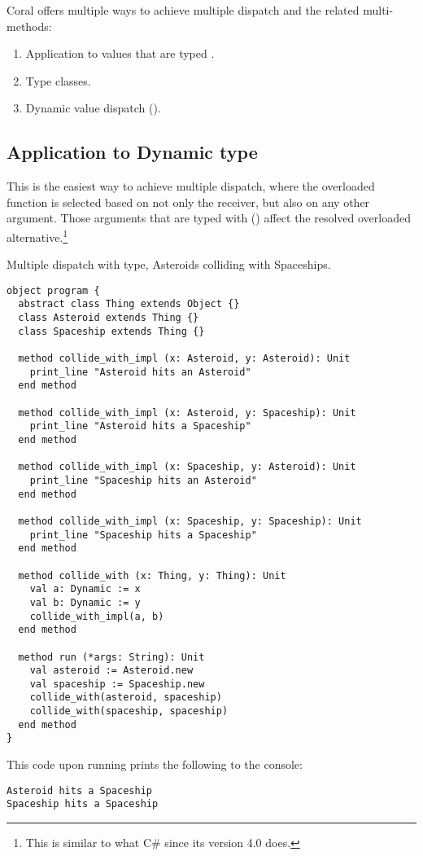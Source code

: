 Coral offers multiple ways to achieve multiple dispatch and the related multi-methods: 

\begin{enumerate}
  \item Application to values that are typed .
  \item Type classes. 
  \item Dynamic value dispatch (). 
\end{enumerate}




\subsection{Application to Dynamic type}

This is the easiest way to achieve multiple dispatch, where the overloaded function is selected based on not only the receiver, but also on any other argument. Those arguments that are typed with  () affect the resolved overloaded alternative.\footnote{This is similar to what C\# since its version 4.0 does.}

\example Multiple dispatch with  type, Asteroids colliding with Spaceships.  
\begin{lstlisting}[morekeywords={Dynamic}]
object program {
  abstract class Thing extends Object {}
  class Asteroid extends Thing {}
  class Spaceship extends Thing {}
  
  method collide_with_impl (x: Asteroid, y: Asteroid): Unit
    print_line "Asteroid hits an Asteroid"
  end method
  
  method collide_with_impl (x: Asteroid, y: Spaceship): Unit
    print_line "Asteroid hits a Spaceship"
  end method
  
  method collide_with_impl (x: Spaceship, y: Asteroid): Unit
    print_line "Spaceship hits an Asteroid"
  end method
  
  method collide_with_impl (x: Spaceship, y: Spaceship): Unit
    print_line "Spaceship hits a Spaceship"
  end method
  
  method collide_with (x: Thing, y: Thing): Unit
    val a: Dynamic := x
    val b: Dynamic := y
    collide_with_impl(a, b)
  end method
  
  method run (*args: String): Unit
    val asteroid := Asteroid.new
    val spaceship := Spaceship.new
    collide_with(asteroid, spaceship)
    collide_with(spaceship, spaceship)
  end method
}
\end{lstlisting}
This code upon running  prints the following to the console:
\begin{lstlisting}
Asteroid hits a Spaceship
Spaceship hits a Spaceship
\end{lstlisting}





